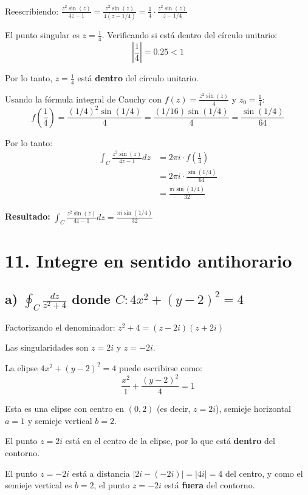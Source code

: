 \documentclass{article}
\begin{document}
Reescribiendo: $\frac{z^2 \sin(z)}{4z - 1} = \frac{z^2 \sin(z)}{4(z - 1/4)} = \frac{1}{4} \cdot \frac{z^2 \sin(z)}{z - 1/4}$

El punto singular es $z = \frac{1}{4}$. Verificando si está dentro del círculo unitario:
$$\left|\frac{1}{4}\right| = 0.25 < 1$$

Por lo tanto, $z = \frac{1}{4}$ está \textbf{dentro} del círculo unitario.

Usando la fórmula integral de Cauchy con $f(z) = \frac{z^2 \sin(z)}{4}$ y $z_0 = \frac{1}{4}$:
$$f\left(\frac{1}{4}\right) = \frac{(1/4)^2 \sin(1/4)}{4} = \frac{(1/16) \sin(1/4)}{4} = \frac{\sin(1/4)}{64}$$

Por lo tanto:
\begin{align*}
\int_C \frac{z^2 \sin(z)}{4z - 1} dz &= 2\pi i \cdot f\left(\frac{1}{4}\right) \\
                                     &= 2\pi i \cdot \frac{\sin(1/4)}{64} \\
                                     &= \frac{\pi i \sin(1/4)}{32}
\end{align*}

\textbf{Resultado:} $\int_C \frac{z^2 \sin(z)}{4z - 1} dz = \frac{\pi i \sin(1/4)}{32}$

\newpage
\section*{11. Integre en sentido antihorario}

\subsection*{a) $\oint_C \frac{dz}{z^2 + 4}$ donde $C: 4x^2 + (y - 2)^2 = 4$}

Factorizando el denominador: $z^2 + 4 = (z - 2i)(z + 2i)$

Las singularidades son $z = 2i$ y $z = -2i$.

La elipse $4x^2 + (y - 2)^2 = 4$ puede escribirse como:
$$\frac{x^2}{1} + \frac{(y - 2)^2}{4} = 1$$

Esta es una elipse con centro en $(0, 2)$ (es decir, $z = 2i$), semieje horizontal $a = 1$ y semieje vertical $b = 2$.

El punto $z = 2i$ está en el centro de la elipse, por lo que está \textbf{dentro} del contorno.

El punto $z = -2i$ está a distancia $|2i - (-2i)| = |4i| = 4$ del centro, y como el semieje vertical es $b = 2$, el punto $z = -2i$ está \textbf{fuera} del contorno.
\end{document}
